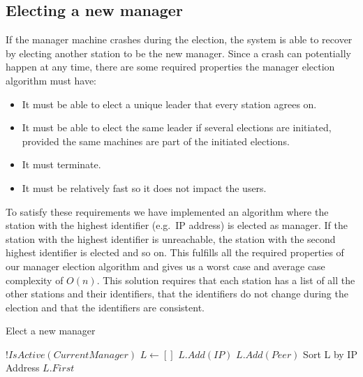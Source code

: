 \documentclass[a4paper]{report}
\begin{document}
\subsection{Electing a new manager}
If the manager machine crashes during the election, the system is able to recover by electing another station to be the new manager. Since a crash can potentially happen at any time, there are some required properties the manager election algorithm must have:

\begin{itemize}

\item It must be able to elect a unique leader that every station agrees on.

\item It must be able to elect the same leader if several elections are initiated, provided the same machines are part of the initiated elections.

\item It must terminate.

\item It must be relatively fast so it does not impact the users.

\end{itemize} 

\noindent To satisfy these requirements we have implemented an algorithm where the station with the highest identifier (e.g.\ IP address) is elected as manager. If the station with the highest identifier is unreachable, the station with the second highest identifier is elected and so on. This fulfills all the required properties of our manager election algorithm and gives us a worst case and average case complexity of $O(n)$. This solution requires that each station has a list of all the other stations and their identifiers, that the identifiers do not change during the election and that the identifiers are consistent.

\begin{algorithm}
\caption{Elect a new manager}
\begin{algorithmic}[1]
\REQUIRE $!IsActive(Current Manager)$ 
\STATE $L \leftarrow []$
\STATE $L.Add(IP)$ 
\STATE $L.Add(Peer)$ 
\ENDIF 
\ENDFOR
\STATE Sort L by IP Address
\RETURN $L.First$ 
\end{algorithmic}
\end{algorithm}
\end{document}
